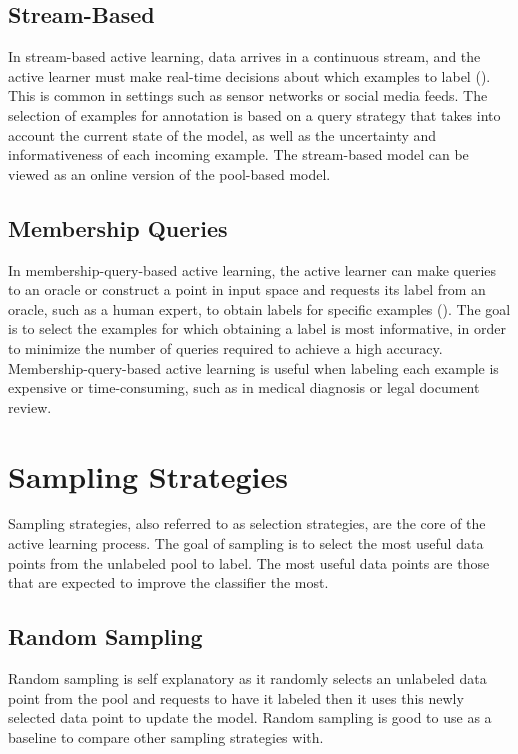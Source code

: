 \subsection{Stream-Based}
In stream-based active learning, data arrives in a continuous stream, and the active learner must make real-time decisions about which examples to label (\cite{baram2004online}). This is common in settings such as sensor networks or social media feeds. The selection of examples for annotation is based on a query strategy that takes into account the current state of the model, as well as the uncertainty and informativeness of each incoming example. The stream-based model can be viewed as an online version of the pool-based model. 

\subsection{Membership Queries}

In membership-query-based active learning, the active learner can make queries to an oracle or construct a point in input space and requests its label from an oracle, such as a human expert, to obtain labels for specific examples (\cite{baram2004online}). The goal is to select the examples for which obtaining a label is most informative, in order to minimize the number of queries required to achieve a high accuracy. Membership-query-based active learning is useful when labeling each example is expensive or time-consuming, such as in medical diagnosis or legal document review.

\section{Sampling Strategies}

Sampling strategies, also referred to as selection strategies, are the core of the active learning process. The goal of sampling is to select the most useful data points from the unlabeled pool to label. The most useful data points are those that are expected to improve the classifier the most.

\subsection{Random Sampling}

Random sampling is self explanatory as it randomly selects an unlabeled data point from the pool and requests to have it labeled then it uses this newly selected data point to update the model. Random sampling is good to use as a baseline to compare other sampling strategies with.

